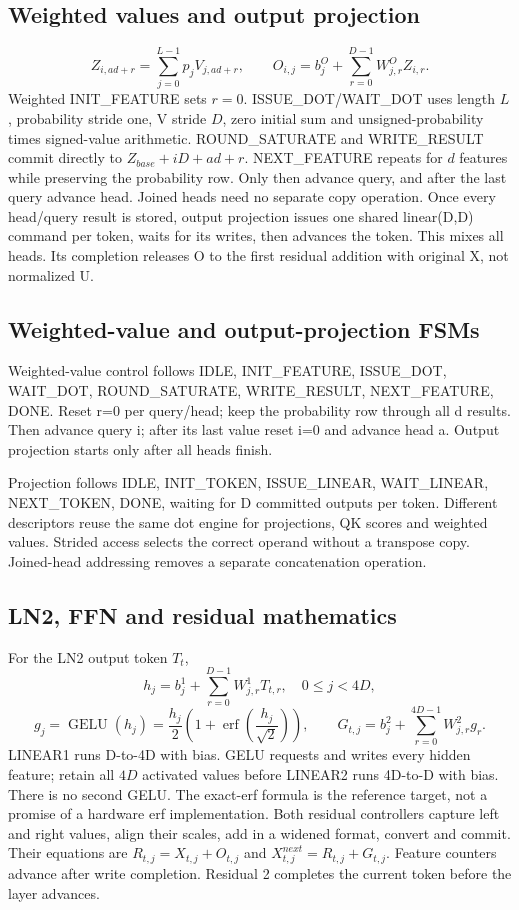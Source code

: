 \documentclass[11pt,a4paper]{article}
\begin{document}
\subsection{Weighted values and output projection}
\[
Z_{i,ad+r}=\sum_{j=0}^{L-1}p_j V_{j,ad+r},\qquad
O_{i,j}=b^O_j+\sum_{r=0}^{D-1}W^O_{j,r}Z_{i,r}.
\]
Weighted INIT\_FEATURE sets $r=0$. ISSUE\_DOT/WAIT\_DOT uses length $L$, probability stride one, V stride $D$, zero initial sum and unsigned-probability times signed-value arithmetic. ROUND\_SATURATE and WRITE\_RESULT commit directly to $Z_{base}+iD+ad+r$. NEXT\_FEATURE repeats for $d$ features while preserving the probability row. Only then advance query, and after the last query advance head. Joined heads need no separate copy operation.
Once every head/query result is stored, output projection issues one shared linear(D,D) command per token, waits for its writes, then advances the token. This mixes all heads. Its completion releases O to the first residual addition with original X, not normalized U.

\subsection{Weighted-value and output-projection FSMs}
Weighted-value control follows IDLE, INIT\_FEATURE, ISSUE\_DOT, WAIT\_DOT, ROUND\_SATURATE, WRITE\_RESULT, NEXT\_FEATURE, DONE. Reset r=0 per query/head; keep the probability row through all d results. Then advance query i; after its last value reset i=0 and advance head a. Output projection starts only after all heads finish.

Projection follows IDLE, INIT\_TOKEN, ISSUE\_LINEAR, WAIT\_LINEAR, NEXT\_TOKEN, DONE, waiting for D committed outputs per token. Different descriptors reuse the same dot engine for projections, QK scores and weighted values. Strided access selects the correct operand without a transpose copy. Joined-head addressing removes a separate concatenation operation.

\subsection{LN2, FFN and residual mathematics}
For the LN2 output token $T_t$,
\[
h_j=b^1_j+\sum_{r=0}^{D-1}W^1_{j,r}T_{t,r},\quad 0\leq j<4D,
\]
\[
g_j=\operatorname{GELU}(h_j)=\frac{h_j}{2}\left(1+\operatorname{erf}\left(\frac{h_j}{\sqrt 2}\right)\right),\qquad
G_{t,j}=b^2_j+\sum_{r=0}^{4D-1}W^2_{j,r}g_r.
\]
LINEAR1 runs D-to-4D with bias. GELU requests and writes every hidden feature; retain all $4D$ activated values before LINEAR2 runs 4D-to-D with bias. There is no second GELU. The exact-erf formula is the reference target, not a promise of a hardware erf implementation.
Both residual controllers capture left and right values, align their scales, add in a widened format, convert and commit. Their equations are $R_{t,j}=X_{t,j}+O_{t,j}$ and $X^{next}_{t,j}=R_{t,j}+G_{t,j}$. Feature counters advance after write completion. Residual 2 completes the current token before the layer advances.
\end{document}
